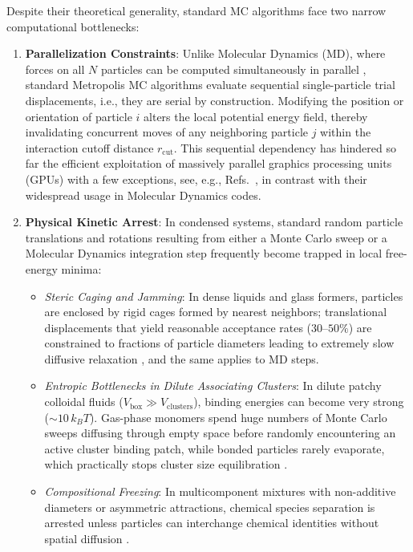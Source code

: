 \documentclass[final,5p,times,twocolumn]{elsarticle}
\begin{document}
Despite their theoretical generality, standard MC algorithms face two
narrow computational bottlenecks: 
\begin{enumerate}
    \item \textbf{Parallelization Constraints}: Unlike Molecular
      Dynamics (MD), where forces on all $N$ particles can be computed
      simultaneously in parallel
      \cite{thompson2022lammps,anderson2008gpu}, standard Metropolis
      MC algorithms evaluate sequential single-particle trial
      displacements, i.e., they are serial by construction. Modifying
      the position or orientation of particle 
      $i$ alters the local potential energy field, thereby
      invalidating concurrent moves of any neighboring particle $j$
      within the interaction cutoff distance $r_{\text{cut}}$. This
      sequential dependency has hindered so far the efficient
      exploitation of massively parallel graphics processing units
      (GPUs)  with a few exceptions, see, e.g., Refs.~\cite{Noya21,anderson2013checkerboard,Engel2013HardDisk,Anderson2020HOOMD,MC-GPU}, in contrast with their widespread usage in Molecular
      Dynamics codes. 
    \item \textbf{Physical Kinetic Arrest}: In condensed systems,
      standard random particle translations and rotations resulting
      from either a Monte Carlo sweep or a Molecular Dynamics
      integration step frequently become trapped in local free-energy minima: 
    \begin{itemize}
        \item \emph{Steric Caging and Jamming}: In dense liquids and
          glass formers, particles are enclosed by rigid cages formed
          by nearest neighbors; translational displacements that yield
          reasonable acceptance rates ($30$--$50\%$) are constrained
          to fractions of  particle diameters
          leading to extremely slow diffusive
          relaxation \cite{ninarello2017models}, and the same applies
          to MD steps.  
        \item \emph{Entropic Bottlenecks in Dilute Associating
        Clusters}: In dilute patchy colloidal fluids ($V_{\text{box}}
          \gg V_{\text{clusters}}$), binding energies  can become very strong
          ($\sim 10\,k_B T$). Gas-phase monomers spend huge
          numbers of Monte Carlo sweeps diffusing through empty space before
          randomly encountering an active cluster binding patch, while
          bonded particles rarely evaporate, which practically stops cluster size
          equilibration
          \cite{whitelam2007avoiding,rovigatti2018simulate}. 
        \item \emph{Compositional Freezing}: In multicomponent
          mixtures with non-additive diameters or asymmetric
          attractions, chemical species separation is arrested unless
          particles can interchange chemical identities without spatial
          diffusion
          \cite{ninarello2017models,berthier2017configurational}. 
    \end{itemize}
\end{enumerate}
\end{document}
